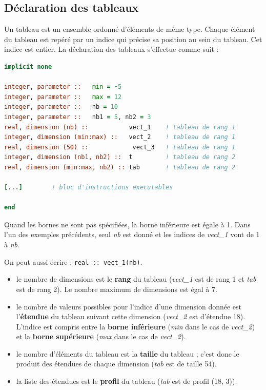 \documentclass[a4paper,twoside]{article}
\begin{document}
\subsection{Déclaration des tableaux}
Un tableau est un ensemble ordonné d'éléments de même type. Chaque élément du tableau est repéré par un indice qui précise sa position au sein du tableau. Cet indice est entier. La déclaration des tableaux s'effectue comme suit :
\begin{lstlisting}[language=Fortran]
implicit none 
  
integer, parameter ::   min = -5       
integer, parameter ::   max = 12        
integer, parameter ::   nb = 10       
integer, parameter ::   nb1 = 5, nb2 = 3       
real, dimension (nb) ::           vect_1    ! tableau de rang 1 
integer, dimension (min:max) ::   vect_2    ! tableau de rang 1
real, dimension (50) ::            vect_3   ! tableau de rang 1
integer, dimension (nb1, nb2) ::  t         ! tableau de rang 2    
real, dimension (min:max, nb2) :: tab       ! tableau de rang 2 

[...]        ! bloc d'instructions executables
 
end
\end{lstlisting}

\begin{remarque}
Quand les bornes ne sont pas spécifiées, la borne inférieure est égale à 1. Dans l'un des exemples précédents, seul \emph{nb} est donné et les indices de \emph{vect\_1} vont de 1 à \emph{nb}. 

On peut aussi écrire : \texttt{real :: vect\_1(nb)}.
\end{remarque}

\begin{itemize}
\item  le nombre de dimensions est le \textbf{rang} du tableau (\emph{vect\_1} est de rang 1 et \emph{tab} est de rang 2). Le nombre maximum de dimensions est égal à 7.

\item  le nombre de valeurs possibles pour l'indice d'une dimension donnée est l'\textbf{étendue} du tableau suivant cette dimension (\emph{vect\_2} est d'étendue 18). L'indice est compris entre la \textbf{borne inférieure} (\emph{min} dans le cas de \emph{vect\_2}) et la \textbf{borne supérieure} (\emph{max} dans le cas de \emph{vect\_2}).

\item  le nombre d'éléments du tableau est la \textbf{taille} du tableau ; c'est donc le produit des étendues de chaque dimension (\emph{tab} est de taille 54).

\item  la liste des étendues est le \textbf{profil} du tableau (\emph{tab} est de profil (18, 3)).
\end{itemize}
\end{document}
